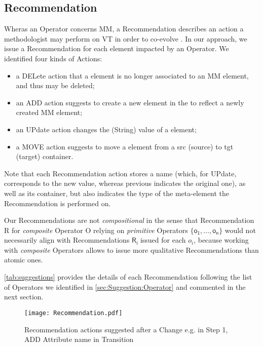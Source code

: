 \subsection{Recommendation}
\label{sec:Suggestion:Recommendation}

Wheras an \textsf{Operator} concerns \textsf{MM}, a \textsf{Recommendation} 
describes an action a methodologist may perform on \textsf{VT} in order to
co-evolve \viewtypes. 
In our approach, we issue a \textsf{Recommendation} for each \viewtype element 
\textsf{impacted} by an \textsf{Operator}. We identified four kinds of \textsf{Action}s: 
\begin{itemize}
	\item a \textsf{DEL}ete action that a \viewtype element is no longer associated
	to an \textsf{MM} element, and thus may be deleted;
	\item an \textsf{ADD} action suggests to create a new element in the \viewtype
	to reflect a newly created \textsf{MM} element;
	\item an \textsf{UP}date action changes the (String) value of a \viewtype element;
	\item a \textsf{MOVE} action suggests to move a \viewtype element from a \textsf{src}
	(source) to \textsf{tgt} (target) container.
\end{itemize}
Note that each \textsf{Recommendation} action stores a \textsf{name} (which, for
\textsf{UP}date, corresponds to the new value, whereas \textsf{previous} 
indicates the original one), as well as its \textsf{container}, but also 
indicates the \textsf{type} of the \viewtype meta-element the 
\textsf{Recommendation} is performed on.

Our \textsf{Recommendation}s are not \emph{compositional} in the sense
that \textsf{Recommendation} \textsf{R} for \emph{composite} \textsf{Operator}
\textsf{O} relying on \emph{primitive} \textsf{Operator}s 
$\{ \mathsf{o_1}, \ldots, \mathsf{o_n} \}$ would not necessarily align with 
\textsf{Recommendation}s $\mathsf{R_i}$ issued for each $o_i$, because working
with \emph{composite} \textsf{Operator}s allows to issue more qualitative
\textsf{Recommendation}s than atomic ones.

\cref{tab:suggestions} provides the details of each \textsf{Recommendation} 
following the list of \textsf{Operator}s we identified in 
\cref{sec:Suggestion:Operator} and commented in the next section.

\begin{figure}[t]
    \centering
    \texttt{[image: Recommendation.pdf]}
    \caption{\textsf{Recommendation} actions suggested after a \textsf{Change}
    e.g. in Step 1, \textsf{ADD} Attribute \textsf{name} in \textsf{Transition}}
    \label{fig:Recommendation}
\end{figure}